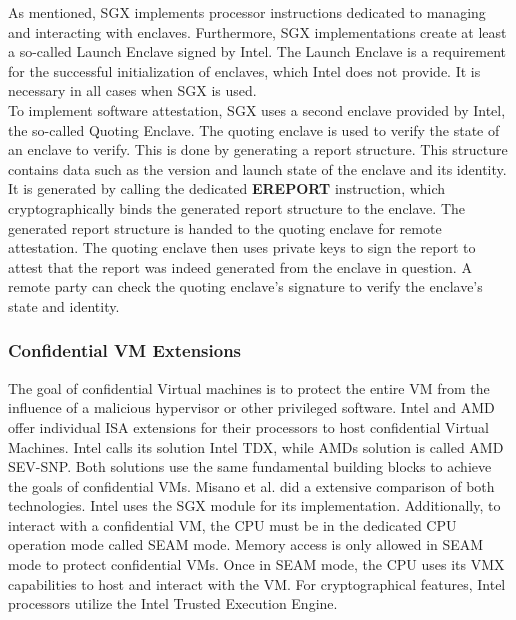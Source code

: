 As mentioned, SGX implements processor instructions dedicated to managing and
interacting with enclaves. Furthermore, SGX implementations create at least a
so-called Launch Enclave signed by Intel. The Launch Enclave is a requirement
for the successful initialization of enclaves, which Intel does not provide. It
is necessary in all cases when SGX is used.\\

To implement software attestation, SGX uses a second enclave provided by Intel,
the so-called Quoting Enclave. The quoting enclave is used to verify the state
of an enclave to verify. This is done by generating a report structure. This
structure contains data such as the version and launch state of the enclave and
its identity. It is generated by calling the dedicated \textbf{EREPORT}
instruction, which cryptographically binds the generated report structure to the
enclave. The generated report structure is handed to the quoting enclave for
remote attestation. The quoting enclave then uses private keys to sign the
report to attest that the report was indeed generated from the enclave in
question. A remote party can check the quoting enclave's signature to verify the
enclave's state and identity.\\

\subsubsection{Confidential VM Extensions}
\label{section:20:confidential_vms}
The goal of confidential Virtual machines is to protect the entire VM from the
influence of a malicious hypervisor or other privileged software. Intel and
AMD offer individual ISA extensions for their processors to host confidential
Virtual Machines. Intel calls its solution Intel TDX, while AMDs solution is
called AMD SEV-SNP.\cite{tdx_whitepaper,kaplan_amd_2020} Both solutions use the
same fundamental building blocks to achieve the goals of confidential VMs.
Misano et al. did a extensive comparison of both
technologies.\cite{misono_confidential_2024} Intel uses the SGX module for its
implementation. Additionally, to interact with a confidential VM, the CPU must
be in the dedicated CPU operation mode called SEAM mode. Memory access is only
allowed in SEAM mode to protect confidential VMs. Once in SEAM mode, the CPU
uses its VMX capabilities to host and interact with the VM. For cryptographical
features, Intel processors utilize the Intel Trusted Execution Engine.\\

